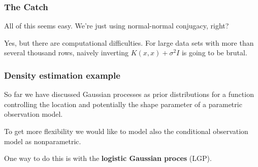 \documentclass{beamer}
\begin{document}
\begin{frame}
\frametitle{The Catch}

All of this seems easy. We're just using normal-normal conjugacy, right?
\newline
\pause

Yes, but there are computational difficulties. For large data sets with more than several thousand rows, naively inverting $K(x,x) + \sigma^2I$ is going to be brutal.

\end{frame}

\begin{frame}
\frametitle{Density estimation example}

So far we have discussed Gaussian processes as prior distributions for a function controlling
the location and potentially the shape parameter of a parametric observation model. 
\pause
\newline


To get more flexibility we would like to model also the conditional observation model as nonparametric.
\newline

One way to do this is with the {\bf logistic Gaussian proces} (LGP).
\end{frame}
\end{document}
